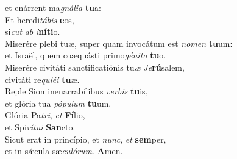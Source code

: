 \evenverse et enárrent ma\textit{gná}\textit{li}\textit{a} \textbf{tu}a:\\
\oddverse Et heredi\textit{tá}\textit{bis} \textbf{e}os,~\*\\
\oddverse si\textit{cut} \textit{ab} \textit{i}\textbf{ní}\textbf{ti}o.\\
\evenverse Miserére plebi tuæ, super quam invocátum est \textit{no}\textit{men} \textbf{tu}um:~\*\\
\evenverse et Israël, quem coæquásti primo\textit{gé}\textit{ni}\textit{to} \textbf{tu}o.\\
\oddverse Miserére civitáti sanctificatiónis tu\textit{æ} \textit{Je}\textbf{rú}salem,~\*\\
\oddverse civitáti re\textit{qui}\textit{é}\textit{i} \textbf{tu}æ.\\
\evenverse Reple Sion inenarrabílibus \textit{ver}\textit{bis} \textbf{tu}is,~\*\\
\evenverse et glória tua \textit{pó}\textit{pu}\textit{lum} \textbf{tu}um.\\
\oddverse Glória Pa\textit{tri}, \textit{et} \textbf{Fí}lio,~\*\\
\oddverse et Spi\textit{rí}\textit{tu}\textit{i} \textbf{San}cto.\\
\evenverse Sicut erat in princípio, et \textit{nunc}, \textit{et} \textbf{sem}per,~\*\\
\evenverse et in sǽcula sæ\textit{cu}\textit{ló}\textit{rum}. \textbf{A}men.\\
